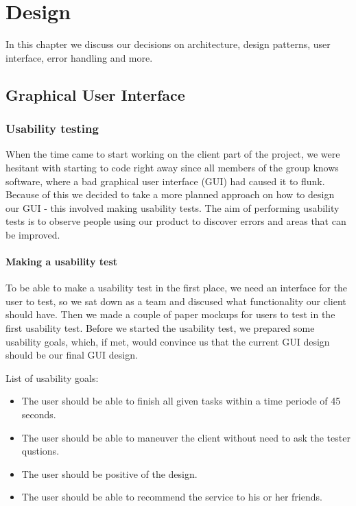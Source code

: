 \chapter{Design}
\label{Design}
In this chapter we discuss our decisions on architecture, design patterns, user interface, error handling and more.

\section{Graphical User Interface}
\label{Design_GUI}
\subsection{Usability testing}
\label{Design_GUI_Usability}
When the time came to start working on the client part of the project, we were hesitant with starting to code right away since all members of the group knows software, where a bad graphical user interface (GUI) had caused it to flunk. Because of this we decided to take a more planned approach on how to design our GUI - this involved making usability tests. The aim of performing usability tests is to observe people using our product to discover errors and areas that can be improved.

\subsubsection{Making a usability test}
\label{Design_GUI_Usability_HowTo}
To be able to make a usability test in the first place, we need an interface for the user to test, so we sat down as a team and discused what functionality our client should have. Then we made a couple of paper mockups for users to test in the first usability test. Before we started the usability test, we prepared some usability goals, which, if met, would convince us that the current GUI design should be our final GUI design.

List of usability goals:
\begin{itemize}\addtolength{\itemsep}{-5pt}
\item The user should be able to finish all given tasks within a time periode of 45 seconds.
\item The user should be able to maneuver the client without need to ask the tester qustions.
\item The user should be positive of the design.
\item The user should be able to recommend the service to his or her friends.
\end {itemize}

